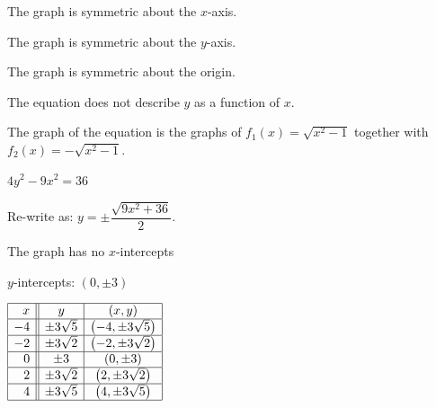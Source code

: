\documentclass{ximera}
\begin{document}
\begin{question}
\begin{problem}
\begin{solution}

The graph is symmetric about the $x$-axis. 

The graph is symmetric about the $y$-axis. 

The graph is symmetric about the origin.  

The equation does not describe $y$ as a function of $x$.

The graph of the equation is the graphs of $f_{1}(x) = \sqrt{x^2-1}$ together with $f_{2}(x) = -\sqrt{x^2-1}$.

\end{solution}

\end{problem}

\begin{problem}
$4y^2-9x^2 = 36$

\begin{solution}

Re-write as: $y = \pm \dfrac{\sqrt{9x^2+36}}{2}$.

The graph has no $x$-intercepts 

$y$-intercepts:  $(0, \pm 3)$

$\begin{array}{|r||c|c|} \hline
 x &   y & (x,y) \\ \hline
-4 & \pm 3 \sqrt{5} &  \left(-4,\pm 3 \sqrt{5}\right) \\  \hline
-2 & \pm 3 \sqrt{2} & \left(-2,\pm 3 \sqrt{2}\right) \\ \hline
0 &  \pm 3 & (0, \pm 3) \\ \hline
2 & \pm 3 \sqrt{2} & \left(2,\pm 3 \sqrt{2}\right) \\ \hline
4 & \pm 3 \sqrt{5} &  \left(4,\pm 3 \sqrt{5}\right) \\  \hline
 
 
\end{array}$ 


\end{solution}
\end{problem}
\end{question}
\end{document}
